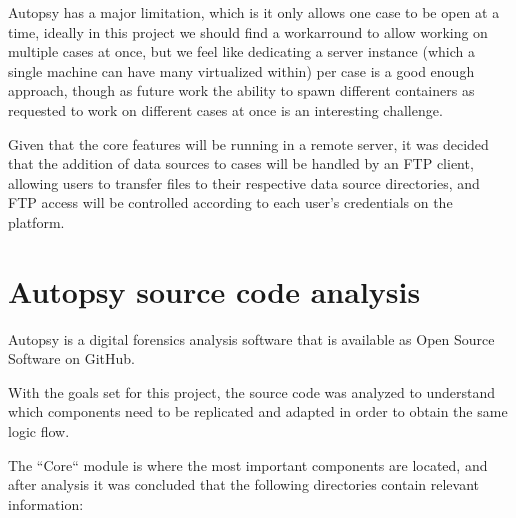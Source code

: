 Autopsy has a major limitation, which is it only allows one case to be open at a time, ideally in this project we should find a workarround to allow working on multiple cases
at once, but we feel like dedicating a server instance (which a single machine can have many virtualized within) per case is a good enough approach, though as future work the
ability to spawn different containers as requested to work on different cases at once is an interesting challenge.

Given that the core features will be running in a remote server, it was decided that the addition of data sources to cases will be handled by an FTP client, allowing users
to transfer files to their respective data source directories, and FTP access will be controlled according to each user's credentials on the platform.

\section{Autopsy source code analysis}

Autopsy is a digital forensics analysis software that is available as Open Source Software on GitHub.

With the goals set for this project, the source code was analyzed to understand which components need to be replicated and adapted in order to obtain the same logic flow.

The ``Core`` module is where the most important components are located, and after analysis it was concluded that the following directories contain relevant information:

